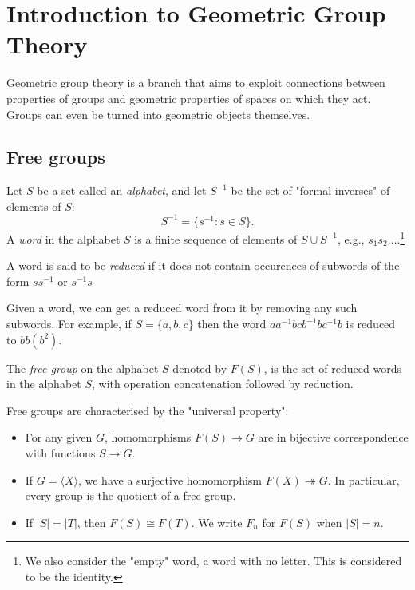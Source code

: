 \documentclass[a4paper]{article}
\begin{document}
    \section{Introduction to Geometric Group Theory}
    Geometric group theory is a branch that aims to exploit connections between properties of groups and geometric properties of spaces on which they act. Groups can even be turned into geometric objects themselves.
    \subsection{Free groups}
    Let $S$ be a set called an \textit{alphabet}, and let $ S^{-1} $ be the set of "formal inverses" of elements of $S$: 
    \[
        S^{-1}=\{s^{-1}:s\in S\}.
    \]
    A \textit{word} in the alphabet $S$ is a finite sequence of elements of $S\cup S^{-1}$, e.g., $s_1s_2\dots$.\footnote{We also consider the "empty" word, a word with no letter. This is considered to be the identity.}

    A word is said to be \textit{reduced} if it does not contain occurences of subwords of the form $ss^{-1}$ or $s^{-1}s$

    Given a word, we can get a reduced word from it by removing any such subwords. For example, if $ S=\{a,b,c\} $ then the word $ aa^{-1}bcb^{-1}bc^{-1}b $ is reduced to $bb(b^2)$.
    \begin{definition}
        The \textit{free group} on the alphabet $S$ denoted by $ F(S) $, is the set of reduced words in the alphabet $S$, with operation concatenation followed by reduction.
    \end{definition}

    Free groups are characterised by the "universal property":
    \begin{proposition}
        \begin{itemize}
            \item For any given $G$, homomorphisms $F(S)\to G$ are in bijective correspondence with functions $ S \to G $.
            \item If $G=\langle X \rangle $, we have a surjective homomorphism $ F(X) \twoheadrightarrow G $. In particular, every group is the quotient of a free group.
            \item If $ |S|=|T| $, then $ F(S)\cong F(T) $. We write $ F_n $ for $F(S)$ when $|S|=n$.
        \end{itemize}
    \end{proposition}
\end{document}

